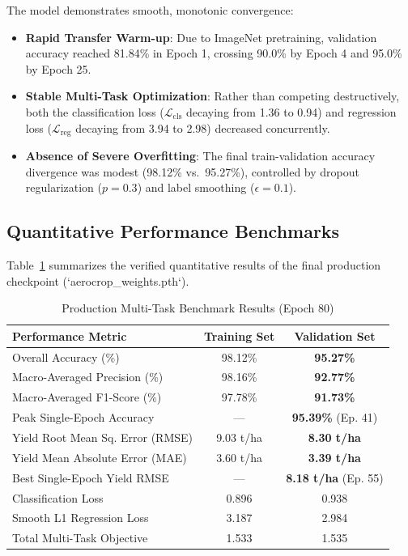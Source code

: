 \documentclass[conference]{IEEEtran}
\begin{document}
The model demonstrates smooth, monotonic convergence:
\begin{itemize}
    \item \textbf{Rapid Transfer Warm-up}: Due to ImageNet pretraining, validation accuracy reached 81.84\% in Epoch 1, crossing 90.0\% by Epoch 4 and 95.0\% by Epoch 25.
    \item \textbf{Stable Multi-Task Optimization}: Rather than competing destructively, both the classification loss ($\mathcal{L}_{\text{cls}}$ decaying from 1.36 to 0.94) and regression loss ($\mathcal{L}_{\text{reg}}$ decaying from 3.94 to 2.98) decreased concurrently.
    \item \textbf{Absence of Severe Overfitting}: The final train-validation accuracy divergence was modest (98.12\% vs.\ 95.27\%), controlled by dropout regularization ($p=0.3$) and label smoothing ($\epsilon=0.1$).
\end{itemize}

\subsection{Quantitative Performance Benchmarks}
Table~\ref{tab:benchmarks} summarizes the verified quantitative results of the final production checkpoint (`aerocrop_weights.pth`).

\begin{table}[t]
\centering
\caption{Production Multi-Task Benchmark Results (Epoch 80)}
\label{tab:benchmarks}
\begin{tabular}{@{}lcc@{}}
\toprule
\textbf{Performance Metric} & \textbf{Training Set} & \textbf{Validation Set} \\
\midrule
Overall Accuracy (\%)             & 98.12\% & \textbf{95.27\%} \\
Macro-Averaged Precision (\%)      & 98.16\% & \textbf{92.77\%} \\
Macro-Averaged F1-Score (\%)       & 97.78\% & \textbf{91.73\%} \\
Peak Single-Epoch Accuracy        & —       & \textbf{95.39\%} (Ep. 41) \\
\midrule
Yield Root Mean Sq. Error (RMSE)   & 9.03 t/ha & \textbf{8.30 t/ha} \\
Yield Mean Absolute Error (MAE)    & 3.60 t/ha & \textbf{3.39 t/ha} \\
Best Single-Epoch Yield RMSE       & —         & \textbf{8.18 t/ha} (Ep. 55) \\
\midrule
Classification Loss                & 0.896   & 0.938 \\
Smooth L1 Regression Loss          & 3.187   & 2.984 \\
Total Multi-Task Objective         & 1.533   & 1.535 \\
\bottomrule
\end{tabular}
\end{table}
\end{document}
